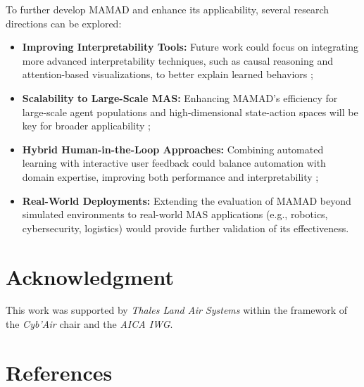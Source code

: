 \documentclass[journal]{IEEEtai}
\begin{document}
To further develop MAMAD and enhance its applicability, several research directions can be explored:
%
\begin{itemize}
    \item \textbf{Improving Interpretability Tools:} Future work could focus on integrating more advanced interpretability techniques, such as causal reasoning and attention-based visualizations, to better explain learned behaviors ;
    \item \textbf{Scalability to Large-Scale MAS:} Enhancing MAMAD's efficiency for large-scale agent populations and high-dimensional state-action spaces will be key for broader applicability ;
    \item \textbf{Hybrid Human-in-the-Loop Approaches:} Combining automated learning with interactive user feedback could balance automation with domain expertise, improving both performance and interpretability ;
    \item \textbf{Real-World Deployments:} Extending the evaluation of MAMAD beyond simulated environments to real-world MAS applications (e.g., robotics, cybersecurity, logistics) would provide further validation of its effectiveness.
\end{itemize}






\section*{Acknowledgment}

This work was supported by \emph{Thales Land Air Systems} within the framework of the \emph{Cyb'Air} chair and the \emph{AICA IWG}.


\section*{References}

\def\refname{}






\end{document}
